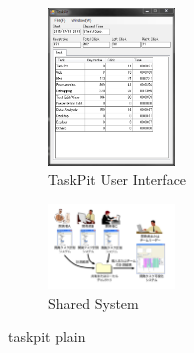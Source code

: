 \documentclass [paper]{ieice}
\begin{document}
\begin{figure}[h]
	\centering	
\includegraphics[width=0.3\textwidth]{fig5}
	\caption{TaskPit User Interface}
	\label{fig5}
\end{figure}

\begin{figure}[h]
	\centering	
\includegraphics[width=0.3\textwidth]{fig6}
	\caption{Shared System}
	\label{fig6}
\end{figure}
	
 {taskpit}
 {plain}
	
\end{document}

